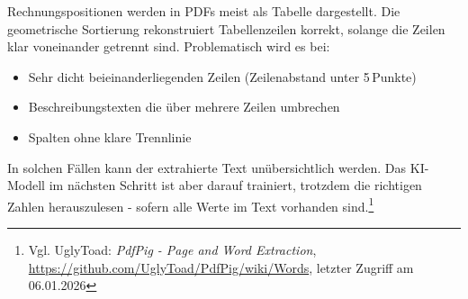 Rechnungspositionen werden in PDFs meist als Tabelle dargestellt. Die geometrische Sortierung rekonstruiert Tabellenzeilen korrekt, solange die Zeilen klar voneinander getrennt sind. Problematisch wird es bei:
\begin{itemize}
    \item Sehr dicht beieinanderliegenden Zeilen (Zeilenabstand unter 5\,Punkte)
    \item Beschreibungstexten die über mehrere Zeilen umbrechen
    \item Spalten ohne klare Trennlinie
\end{itemize}

In solchen Fällen kann der extrahierte Text unübersichtlich werden. Das KI-Modell im nächsten Schritt ist aber darauf trainiert, trotzdem die richtigen Zahlen herauszulesen - sofern alle Werte im Text vorhanden sind.\footnote{Vgl. UglyToad: \textit{PdfPig - Page and Word Extraction}, \url{https://github.com/UglyToad/PdfPig/wiki/Words}, letzter Zugriff am 06.01.2026}
